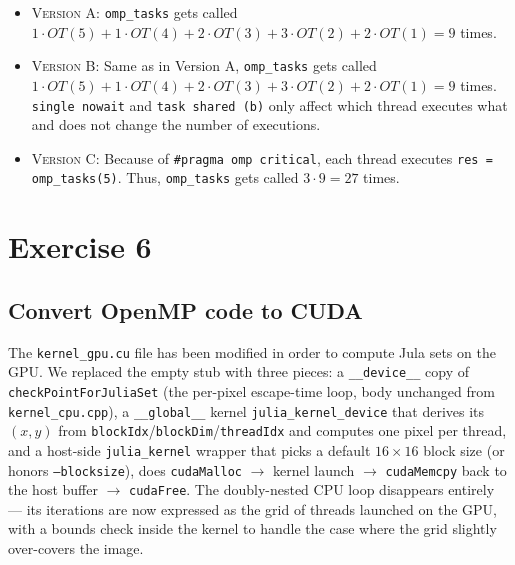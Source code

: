 \documentclass[a4paper,%
11pt,%
DIV12,
headsepline,%
headings=normal,
]{scrartcl}
\begin{document}
\begin{itemize}
	\item \textsc{Version A}: \texttt{omp\_tasks}  gets called $ 1 \cdot OT(5) +1\cdot OT(4) +2\cdot OT(3) +3\cdot OT(2) +2\cdot OT(1)= 9$ times.
	
	\item \textsc{Version B}: Same as in Version A, \texttt{omp\_tasks}  gets called $ 1 \cdot OT(5) +1\cdot OT(4) +2\cdot OT(3) +3\cdot OT(2) +2\cdot OT(1)= 9$ times. \texttt{single nowait} and \texttt{task shared (b)} only affect which thread executes what and does not change the number of executions.
	
	\item \textsc{Version C}: Because of \texttt{\#pragma omp critical}, each thread executes \texttt{res = omp\_tasks(5)}. Thus, \texttt{omp\_tasks} gets called $ 3 \cdot 9 = 27$ times. 
	
	
\end{itemize}

\section{Exercise 6}

\subsection{Convert OpenMP code to CUDA}
The \verb|kernel_gpu.cu| file has been modified in order to compute Jula sets on the GPU. We replaced the empty stub with three pieces: a \texttt{\_\_device\_\_} copy of \texttt{checkPointForJuliaSet} (the per-pixel escape-time loop, body unchanged from \texttt{kernel\_cpu.cpp}), a \texttt{\_\_global\_\_} kernel \texttt{julia\_kernel\_device} that derives its $(x, y)$ from \texttt{blockIdx}/\texttt{blockDim}/\texttt{threadIdx} and computes one pixel per thread, and a host-side \texttt{julia\_kernel} wrapper that picks a default $16 \times 16$ block size (or honors \texttt{--blocksize}), does \texttt{cudaMalloc} $\rightarrow$ kernel launch $\rightarrow$ \texttt{cudaMemcpy} back to the host buffer $\rightarrow$ \texttt{cudaFree}. The doubly-nested CPU loop disappears entirely --- its iterations are now expressed as the grid of threads launched on the GPU, with a bounds check inside the kernel to handle the case where the grid slightly over-covers the image.

\end{document}
